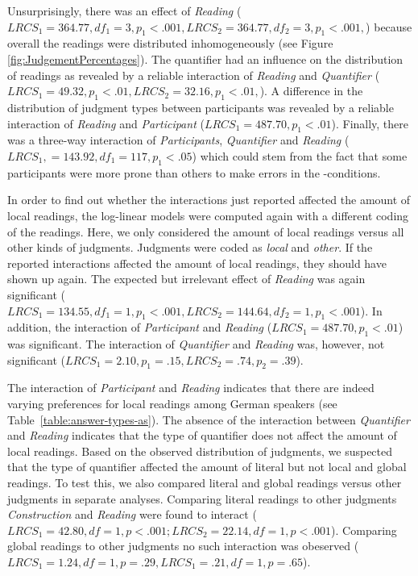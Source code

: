 \documentclass[fleqn,reqno,10pt,draft]{article}
\renewcommand{\es}{\acro{es}}
\begin{document}
Unsurprisingly, there was an effect of \emph{Reading} ($LRCS_1=364.77,
df_1 = 3, p_1<.001, LRCS_2=364.77, df_2 = 3, p_1<.001,$) because
overall the readings were distributed inhomogeneously (see Figure
\ref{fig:JudgementPercentages}). The quantifier had an influence on the
distribution of readings as revealed by a reliable interaction of {\it
  Reading} and {\it Quantifier} ($LRCS_1=49.32, p_1<.01,LRCS_2=32.16,
p_1<.01,$). A difference in the distribution of judgment types
between participants was revealed by a reliable interaction of {\it
  Reading} and {\it Participant} ($LRCS_1=487.70, p_1<.01$).  Finally,
there was a three-way interaction of {\it Participants}, {\it
  Quantifier} and {\it Reading} ($LRCS_1, = 143.92, df_1 = 117,
p_1<.05$) which could stem from the fact that some participants were
more prone than others to make errors in the \es-conditions.

In order to find out whether the interactions just reported affected
the amount of local readings, the log-linear models were computed
again with a different coding of the readings. Here, we only
considered the amount of local readings versus all other kinds of
judgments. Judgments were coded as {\it local} and {\it other}. If the
reported interactions affected the amount of local readings, they should
have shown up again. The expected but irrelevant effect of {\it Reading} was
again significant ($LRCS_1=134.55, df_1 = 1, p_1<.001, LRCS_2=144.64,
df_2 = 1, p_1<.001$). In addition, the interaction of {\it
  Participant} and {\it Reading} ($LRCS_1=487.70, p_1<.01$) was significant. The interaction of {\it
  Quantifier} and {\it Reading} was, however, not significant ($LRCS_1=2.10,
p_1=.15,LRCS_2=.74, p_2=.39$).

The interaction of {\it Participant} and {\it Reading} indicates that
there are indeed varying preferences for local readings among German
speakers (see Table~\ref{table:answer-types-as}). The absence of the interaction
between {\it Quantifier} and {\it Reading} indicates that the type of quantifier does not affect the amount of local readings.
Based on the observed distribution of judgments, we suspected that the type of quantifier affected the
amount of literal but not local and global readings. To test
this, we also compared literal and global readings versus
other judgments in separate analyses. Comparing literal readings to
other judgments {\it Construction} and {\it Reading} were found to
interact ($LRCS_1=42.80, df= 1, p<.001; LRCS_2=22.14, df= 1,
p<.001$). Comparing global readings to other judgments no such
interaction was obeserved ($LRCS_1=1.24, df= 1, p=.29, LRCS_1=.21, df=
1, p=.65$).
\end{document}
